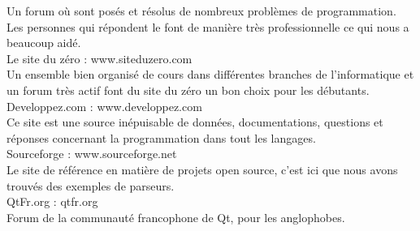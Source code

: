 \documentclass[a4paper, 12pt]{report}
\begin{document}
\begin{thebibliography}{2}
		Un forum où sont posés et résolus de nombreux problèmes de programmation. Les personnes qui répondent le font de manière
		très professionnelle ce qui nous a beaucoup aidé.
		~\\
		Le site du zéro : www.siteduzero.com \\
		Un ensemble bien organisé de cours dans différentes branches de l'informatique et un forum très actif font du site du zéro
		un bon choix pour les débutants.
		~\\
		Developpez.com : www.developpez.com \\
		Ce site est une source inépuisable de données, documentations, questions et réponses concernant la programmation dans tout les langages.
		~\\
		Sourceforge : www.sourceforge.net \\
		Le site de référence en matière de projets open source, c'est ici que nous avons trouvés des exemples de parseurs.
		~\\
		QtFr.org : qtfr.org \\
		Forum de la communauté francophone de Qt, pour les anglophobes.
		\end{thebibliography}
\end{document}
